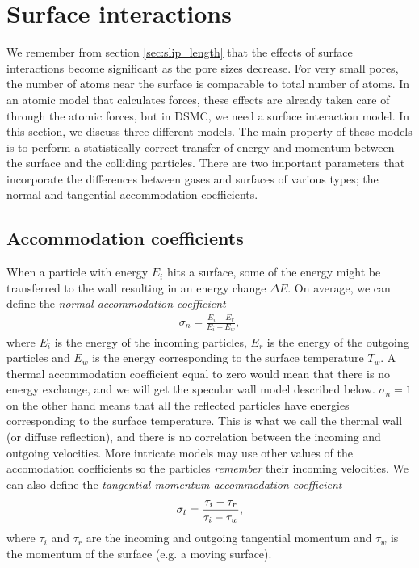 \section{Surface interactions}
\label{sec:surface_interactions}
We remember from section \ref{sec:slip_length} that the effects of surface interactions become significant as the pore sizes decrease. For very small pores, the number of atoms near the surface is comparable to total number of atoms. In an atomic model that calculates forces, these effects are already taken care of through the atomic forces, but in DSMC, we need a surface interaction model. In this section, we discuss three different models. The main property of these models is to perform a statistically correct transfer of energy and momentum between the surface and the colliding particles. There are two important parameters that incorporate the differences between gases and surfaces of various types; the normal and tangential accommodation coefficients.
\subsection{Accommodation coefficients}
\label{sec:accomodation_coefficients}
When a particle with energy $E_i$ hits a surface, some of the energy might be transferred to the wall resulting in an energy change $\Delta E$. On average, we can define the \textit{normal accommodation coefficient} 
\begin{align}
	\sigma_n = \frac{E_i - E_r}{E_i - E_w},
\end{align}
where $E_i$ is the energy of the incoming particles, $E_r$ is the energy of the outgoing particles and $E_w$ is the energy corresponding to the surface temperature $T_w$. A thermal accommodation coefficient equal to zero would mean that there is no energy exchange, and we will get the specular wall model described below. $\sigma_n=1$ on the other hand means that all the reflected particles have energies corresponding to the surface temperature. This is what we call the thermal wall (or diffuse reflection\cite{karniadakis2005microflows}), and there is no correlation between the incoming and outgoing velocities. More intricate models may use other values of the accomodation coefficients so the particles \textit{remember} their incoming velocities. We can also define the \textit{tangential momentum accommodation coefficient}
\begin{align}
	\sigma_t = {\tau_i - \tau_r\over \tau_i - \tau_w},
\end{align}
where $\tau_i$ and $\tau_r$ are the incoming and outgoing tangential momentum and $\tau_w$ is the momentum of the surface (e.g. a moving surface). 

